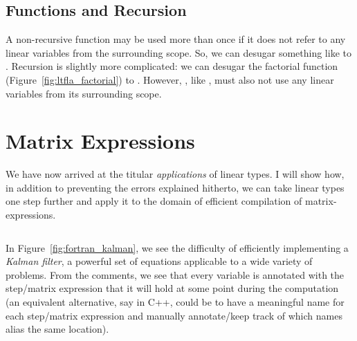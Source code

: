 \subsection{Functions and Recursion}

A non-recursive function may be used more than once if it does not refer to any
linear variables from the surrounding scope. So, we can desugar something like
 to . Recursion is
slightly more complicated: we can desugar the factorial function
(Figure~\ref{fig:ltfla_factorial}) to . However, , like ,
must also not use any linear variables from its surrounding scope.

\section{Matrix Expressions}

We have now arrived at the titular \emph{applications} of linear types. I will
show how, in addition to preventing the errors explained hitherto, we can take
linear types one step further and apply it to the domain of efficient
compilation of matrix-expressions.

\begin{sidewaysfigure}
    \inputminted[linenos, fontsize=\footnotesize]{fortran}{kalman.f90}
    \caption{Kalman filter in Fortran 90.}\label{fig:fortran_kalman}
\end{sidewaysfigure}

In Figure~\ref{fig:fortran_kalman}, we see the difficulty of efficiently
implementing a \emph{Kalman filter}, a powerful set of equations applicable
to a wide variety of problems. From the comments, we see that every variable is
annotated with the step/matrix expression that it will hold at some point
during the computation (an equivalent alternative, say in C++, could be to have
a meaningful name for each step/matrix expression and manually annotate/keep
track of which names alias the same location).

